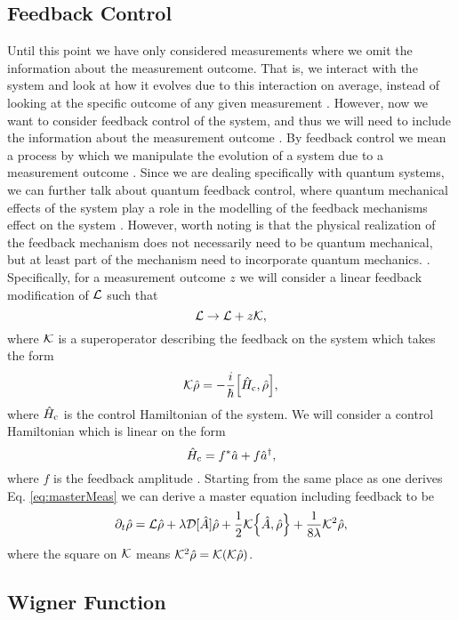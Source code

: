\subsection{Feedback Control}
Until this point we have only considered measurements where we omit the information about the measurement outcome. That is, we interact with the system and look at how it evolves due to this interaction on average, instead of looking at the specific outcome of any given measurement \cite{Annby-Andersson:2024}. However, now we want to consider feedback control of the system, and thus we will need to include the information about the measurement outcome \cite{Annby-Andersson:2024}. By feedback control we mean a process by which we manipulate the evolution of a system due to a measurement outcome \cite{Wiseman:2009}. Since we are dealing specifically with quantum systems, we can further talk about quantum feedback control, where quantum mechanical effects of the system play a role in the modelling of the feedback mechanisms effect on the system \cite{Wiseman:2009}. However, worth noting is that the physical realization of the feedback mechanism does not necessarily need to be quantum mechanical, but at least part of the mechanism need to incorporate quantum mechanics. \cite{Wiseman:2009}. Specifically, for a measurement outcome $z$ we will consider a linear feedback modification of $\mathcal{L}$ such that 
\begin{equation}
    \mathcal{L} \to \mathcal{L} + z \mathcal{K},
\end{equation}  
where $\mathcal{K}$ is a superoperator describing the feedback on the system \cite{Annby-Andersson:2024} which takes the form
\begin{equation}
    \feedback\dmatrix = - \frac{i}{\hbar} \comm{\hamiltonian_\mathrm{c}}{\dmatrix},
\end{equation}
where $\hat{H}_\mathrm{c}$ is the control Hamiltonian of the system. We will consider a control Hamiltonian which is linear on the form
\begin{equation}
    \hat{H}_\mathrm{c} = f^* \hat{a} + f \hat{a}^{\dagger},
\end{equation}
where $f$ is the feedback amplitude \cite{Wiseman:2009}. Starting from the same place as one derives Eq. \eqref{eq:masterMeas} we can derive a master equation including feedback \cite{Annby-Andersson:2024} to be
\begin{equation}
    \dt\dmatrix = \liouvillian\dmatrix + \lambda \super{\hat{A}} \dmatrix + \frac{1}{2} \feedback \acomm{\hat{A}}{\dmatrix} + \frac{1}{8\lambda} \feedback^2 \dmatrix, \label{eq:masterFeed}
\end{equation}
where the square on $\mathcal{K}$ means $ \mathcal{K}^2 \hat{\rho} = \mathcal{K} ( \mathcal{K} \hat{\rho})$.

\subsection{Wigner Function}